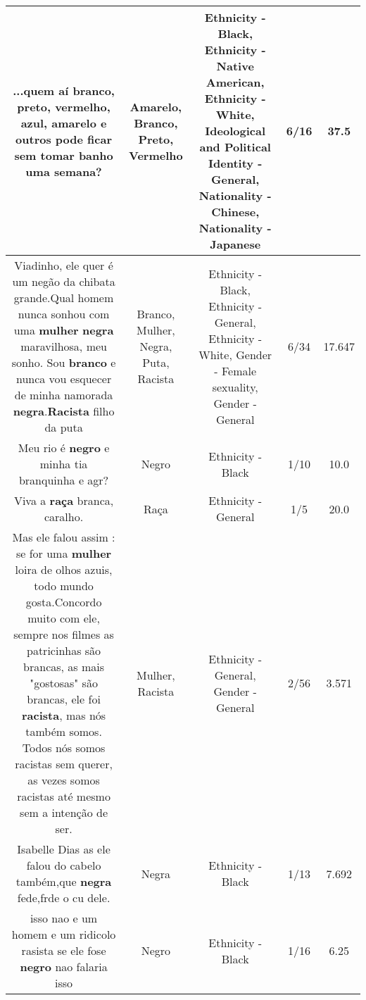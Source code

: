 \documentclass[11pt]{article}
\newlength\mylength
\begin{document}
\begin{center}
\begin{longtable}{|C{.65\mylength}|C{.30\mylength}|C{.12\mylength}|C{.12\mylength}|C{.12\mylength}|}
  \small ...quem aí \textbf{branco}, \textbf{preto}, \textbf{v\textbf{ermelho}}, azul, \textbf{a\textbf{marelo}} e outros pode ficar sem tomar banho uma semana?\normalsize   & Amarelo, Branco, Preto, Vermelho & Ethnicity - Black, Ethnicity - Native American, Ethnicity - White, Ideological and Political Identity - General, Nationality - Chinese, Nationality - Japanese & 6/16 & 37.5 \\  \hline
  \small Viadinho, ele quer é um negão da chibata grande.Qual homem nunca sonhou com uma \textbf{mulher} \textbf{negra} maravilhosa, meu sonho. Sou \textbf{branco} e nunca vou esquecer de minha namorada \textbf{negra}.\textbf{Racista} filho da puta\normalsize   & Branco, Mulher, Negra, Puta, Racista & Ethnicity - Black, Ethnicity - General, Ethnicity - White, Gender - Female sexuality, Gender - General & 6/34 & 17.647 \\  \hline
  \small Meu rio é \textbf{negro} e minha tia branquinha e agr?\normalsize   & Negro & Ethnicity - Black & 1/10 & 10.0 \\  \hline
  \small Viva a \textbf{raça} branca, caralho.\normalsize   & Raça & Ethnicity - General & 1/5 & 20.0 \\  \hline
  \small Mas ele falou assim : se for uma \textbf{mulher} loira de olhos azuis, todo mundo gosta.Concordo muito com ele, sempre nos filmes as patricinhas são brancas, as mais "gostosas" são brancas, ele foi \textbf{racista}, mas nós também somos. Todos nós somos racistas sem querer, as vezes somos racistas até mesmo sem a intenção de ser.\normalsize   & Mulher, Racista & Ethnicity - General, Gender - General & 2/56 & 3.571 \\  \hline
  \small Isabelle Dias as ele falou do cabelo também,que \textbf{negra} fede,frde o cu dele.\normalsize   & Negra & Ethnicity - Black & 1/13 & 7.692 \\  \hline
  \small isso nao e um homem e um ridicolo rasista se ele fose \textbf{negro} nao falaria isso\normalsize   & Negro & Ethnicity - Black & 1/16 & 6.25 \\  \hline

\end{longtable}
\end{center}
\end{document}
